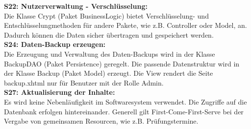 \textbf{S22: Nutzerverwaltung - Verschlüsselung:}\\
Die Klasse Crypt (Paket BusinessLogic) bietet Verschlüsselung- und Entschlüsselungmethoden für andere Pakete, wie z.B. Controller oder Model, an. Dadurch können die Daten sicher übertragen und gespeichert werden.  \\

\textbf{S24: Daten-Backup erzeugen:}\\
Die Erzeugung und Verwaltung des Daten-Backups wird in der Klasse  BackupDAO (Paket Persistence) geregelt. Die passende Datenstruktur wird in der Klasse Backup (Paket Model) erzeugt. Die View rendert die Seite backup.xhtml nur für Benutzer mit der Rolle Admin.\\

\textbf{S27: Aktualisierung der Inhalte:}\\
Es wird keine Nebenläufigkeit im Softwaresystem verwendet. Die Zugriffe auf die Datenbank erfolgen hintereinander. Generell gilt First-Come-First-Serve bei der Vergabe von gemeinsamen Resourcen, wie z.B. Prüfungstermine.